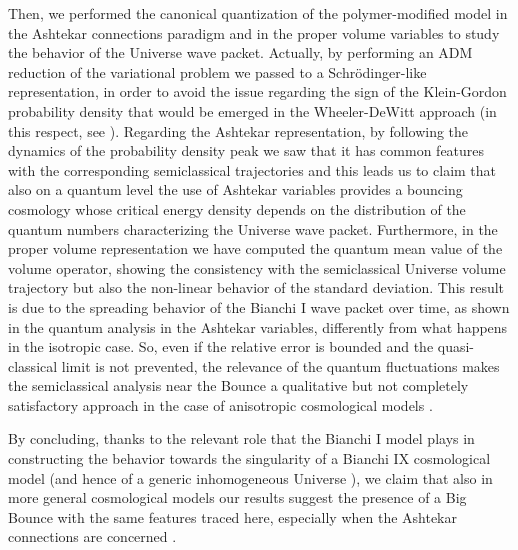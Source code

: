 \documentclass[aps,prd,twocolumn,nofootinbib,superscriptaddress]{revtex4-2}
\begin{document}
Then, we performed the canonical quantization of the polymer-modified model in the Ashtekar connections paradigm and in the proper volume variables to study the behavior of the Universe wave packet.
Actually, by performing an ADM reduction of the
variational problem we passed to a Schr\"{o}dinger-like
representation, in order to avoid the issue regarding the sign of the Klein-Gordon probability density that would be emerged in the Wheeler-DeWitt approach
(in this respect, see \cite{shell,rosenstein1985probability}). Regarding the Ashtekar representation, by following the dynamics of the probability density peak we saw that it has common features with the corresponding semiclassical trajectories and this
leads us to claim that also on a quantum level the use of Ashtekar variables provides a bouncing cosmology whose critical energy density depends on the distribution of the quantum numbers characterizing the Universe wave packet. Furthermore, in the proper volume representation we have computed the quantum mean value of the volume operator, showing the consistency with the semiclassical Universe volume trajectory but also the non-linear behavior of the standard deviation. This result is due to the spreading behavior of the Bianchi I wave packet over time, as shown in the quantum analysis in the Ashtekar variables, differently from what happens in the isotropic case. So, even if the relative error is bounded and the quasi-classical limit is not prevented, the relevance of the quantum fluctuations makes the semiclassical analysis near the Bounce a qualitative but not completely satisfactory approach in the case of anisotropic cosmological models \cite{QBB}.

By concluding, thanks to the relevant role that the Bianchi I model plays in constructing the behavior towards the singularity of a Bianchi IX cosmological model (and
hence of a generic inhomogeneous Universe \cite{BKL82,PC}), we claim that also in more general cosmological models our results suggest the presence of a Big Bounce with the same features traced here, especially when the Ashtekar connections are concerned
\cite{ABKL}.
	
\nocite{*}

		
\end{document}
